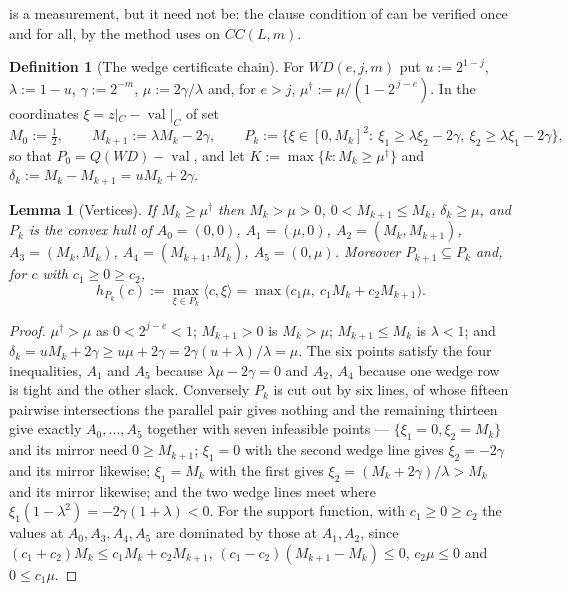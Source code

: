 \documentclass[11pt]{article}
\theoremstyle{plain}
\newtheorem{lemma}[theorem]{Lemma}
\theoremstyle{definition}
\newtheorem{definition}[theorem]{Definition}
\DeclareMathOperator{\val}{val}
\begin{document}
 is a measurement, but it need not be: the clause
condition of  can be verified once and for
all, by the method  uses on $CC(L,m)$.

\begin{definition}[The wedge certificate chain]\label{def:wedge-chain}
For $WD(e,j,m)$ put $u:=2^{1-j}$, $\lambda:=1-u$, $\gamma:=2^{-m}$,
$\mu:=2\gamma/\lambda$ and, for $e>j$,
$\mu^{\dagger}:=\mu/(1-2^{\,j-e})$. In the coordinates
$\xi=z|_C-\val|_C$ of  set
\[
  M_0:=\tfrac12,\qquad M_{k+1}:=\lambda M_k-2\gamma,\qquad
  P_k:=\bigl\{\xi\in[0,M_k]^2:\ \xi_1\ge\lambda\xi_2-2\gamma,\
  \xi_2\ge\lambda\xi_1-2\gamma\bigr\},
\]
so that $P_0=Q(WD)-\val$, and let $K:=\max\{k:M_k\ge\mu^{\dagger}\}$ and
$\delta_k:=M_k-M_{k+1}=uM_k+2\gamma$.
\end{definition}

\begin{lemma}[Vertices]\label{lem:wedge-verts}
If $M_k\ge\mu^{\dagger}$ then $M_k>\mu>0$, $0<M_{k+1}\le M_k$,
$\delta_k\ge\mu$, and $P_k$ is the convex hull of
$A_0=(0,0)$, $A_1=(\mu,0)$, $A_2=(M_k,M_{k+1})$, $A_3=(M_k,M_k)$,
$A_4=(M_{k+1},M_k)$, $A_5=(0,\mu)$. Moreover $P_{k+1}\subseteq P_k$ and,
for $c$ with $c_1\ge0\ge c_2$,
\[
  h_{P_k}(c):=\max_{\xi\in P_k}\langle c,\xi\rangle
  =\max\bigl(c_1\mu,\ c_1M_k+c_2M_{k+1}\bigr).
\]
\end{lemma}

\begin{proof}
$\mu^{\dagger}>\mu$ as $0<2^{j-e}<1$; $M_{k+1}>0$ is $M_k>\mu$;
$M_{k+1}\le M_k$ is $\lambda<1$; and
$\delta_k=uM_k+2\gamma\ge u\mu+2\gamma=2\gamma(u+\lambda)/\lambda=\mu$. The
six points satisfy the four inequalities, $A_1$ and $A_5$ because
$\lambda\mu-2\gamma=0$ and $A_2$, $A_4$ because one wedge row is tight and
the other slack. Conversely $P_k$ is cut out by six lines, of whose
fifteen pairwise intersections the parallel pair gives nothing and the
remaining thirteen give exactly $A_0,\dots,A_5$ together with seven
infeasible points --- $\{\xi_1=0,\xi_2=M_k\}$ and its mirror need
$0\ge M_{k+1}$; $\xi_1=0$ with the second wedge line gives
$\xi_2=-2\gamma$ and its mirror likewise; $\xi_1=M_k$ with the first gives
$\xi_2=(M_k+2\gamma)/\lambda>M_k$ and its mirror likewise; and the two
wedge lines meet where $\xi_1(1-\lambda^2)=-2\gamma(1+\lambda)<0$.
For the support function, with $c_1\ge0\ge c_2$ the values at
$A_0,A_3,A_4,A_5$ are dominated by those at $A_1,A_2$, since
$(c_1+c_2)M_k\le c_1M_k+c_2M_{k+1}$, $(c_1-c_2)(M_{k+1}-M_k)\le0$,
$c_2\mu\le0$ and $0\le c_1\mu$.
\end{proof}
\end{document}
